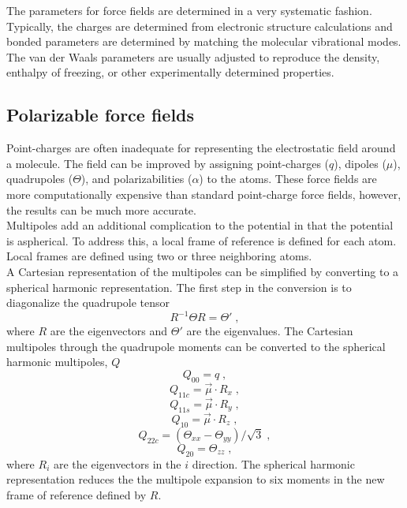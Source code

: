 \documentclass[12pt]{report}
\begin{document}
The parameters for force fields are determined in a very systematic fashion.
Typically, the charges are determined from electronic structure calculations
and bonded parameters are determined by matching the molecular vibrational
modes.
The van der Waals parameters are usually adjusted to reproduce the density,
enthalpy of freezing, or other experimentally determined properties.

\subsection{Polarizable force fields}

Point-charges are often inadequate for representing the electrostatic field
around a molecule.
The field can be improved by assigning point-charges ($q$), dipoles ($\mu$),
quadrupoles ($\Theta$), and polarizabilities ($\alpha$) to the atoms.
These force fields are more computationally expensive than standard
point-charge force fields, however, the results can be much more accurate. \\

Multipoles add an additional complication to the potential in that the
potential is aspherical.
To address this, a local frame of reference is defined for each atom.
Local frames are defined using two or three neighboring atoms. \\

A Cartesian representation of the multipoles can be simplified by converting
to a spherical harmonic representation.
The first step in the conversion is to diagonalize the quadrupole tensor
\begin{equation}
 R^{-1}\Theta R = \Theta' \; ,
\end{equation}
where $R$ are the eigenvectors and $\Theta'$ are the eigenvalues.
The Cartesian multipoles through the quadrupole moments can be converted to
the spherical harmonic multipoles, $Q$
\begin{equation}
 Q_{00} = q \; ,
\end{equation}
\begin{equation}
 Q_{11c} = \vec \mu \cdot R_x \; ,
\end{equation}
\begin{equation}
 Q_{11s} = \vec \mu \cdot R_y \; ,
\end{equation}
\begin{equation}
 Q_{10} = \vec \mu \cdot R_z \; ,
\end{equation}
\begin{equation}
 Q_{22c} = (\Theta_{xx}-\Theta_{yy})/\sqrt{3} \; ,
\end{equation}
\begin{equation}
 Q_{20} = \Theta_{zz} \; ,
\end{equation}
where $R_i$ are the eigenvectors in the $i$ direction.
The spherical harmonic representation reduces the the multipole expansion to
six moments in the new frame of reference defined by $R$. \cite{} \\
\end{document}
